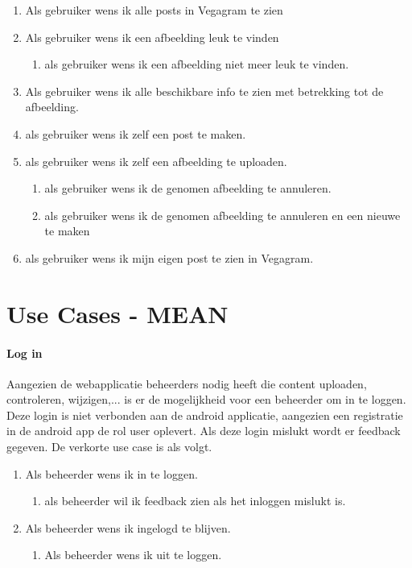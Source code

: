  \begin{enumerate}
	\item Als gebruiker wens ik alle posts in Vegagram te zien
	\item Als gebruiker wens ik een afbeelding leuk te vinden
		\begin{enumerate}
		\item als gebruiker wens ik een afbeelding niet meer leuk te vinden.
	\end{enumerate}
	\item Als gebruiker wens ik alle beschikbare info te zien met betrekking tot de afbeelding.
	\item als gebruiker wens ik zelf een post te maken.
	\item als gebruiker wens ik zelf een afbeelding te uploaden.
		\begin{enumerate}
		\item als gebruiker wens ik de genomen afbeelding te annuleren.
		\item als gebruiker wens ik de genomen afbeelding te annuleren en een nieuwe te maken
	\end{enumerate}
	\item als gebruiker wens ik mijn eigen post te zien in Vegagram.
\end{enumerate}

\section{Use Cases - MEAN}
\paragraph{Log in}

Aangezien de webapplicatie beheerders nodig heeft die content uploaden, controleren, wijzigen,...
is er de mogelijkheid voor een beheerder om in te loggen. Deze login is niet verbonden aan de 
android applicatie, aangezien een registratie in de android app de rol user oplevert. Als deze 
login mislukt wordt er feedback gegeven. De verkorte use case is als volgt.

\begin{enumerate}
	\item Als beheerder wens ik in te loggen.
	\begin{enumerate}
		\item als beheerder wil ik feedback zien als het inloggen mislukt is.
	\end{enumerate}
	\item Als beheerder wens ik ingelogd te blijven.
	\begin{enumerate}
	\item Als beheerder wens ik uit te loggen.
	\end{enumerate}
\end{enumerate}

